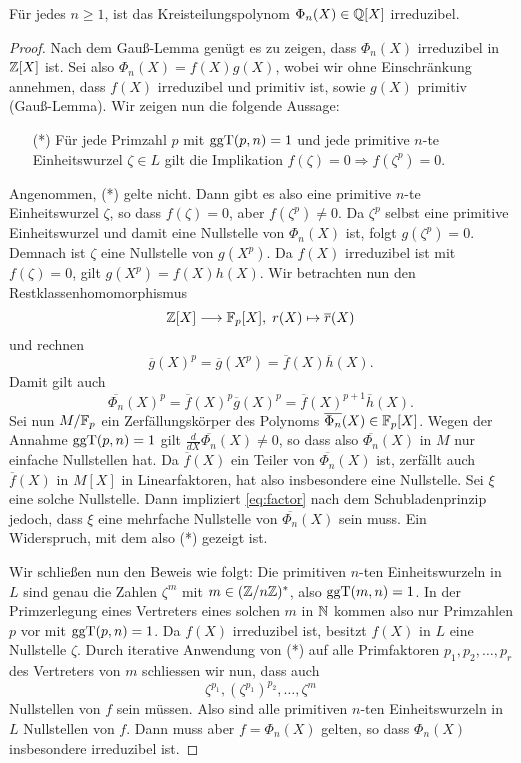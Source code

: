 \documentclass{book}
\begin{document}
\begin{thm}
Für jedes $n \ge 1$, ist das Kreisteilungspolynom $\Phi_n(X) \in \mathbb{Q}[X]$ irreduzibel. 
\end{thm}
\begin{proof}
	Nach dem Gauß-Lemma genügt es zu zeigen, dass $\Phi_n(X)$ irreduzibel in $\mathbb{Z}[X]$ ist. Sei
	also $\Phi_n(X) = f(X) g(X)$, wobei wir ohne Einschränkung annehmen, dass $f(X)$ irreduzibel
	und primitiv ist, sowie $g(X)$ primitiv (Gauß-Lemma). Wir zeigen nun die folgende Aussage:
	\begin{itemize}
		\item[(*)] Für jede Primzahl $p$ mit $\operatorname{ggT}(p,n) =1$ und jede primitive $n$-te
			Einheitswurzel $\zeta \in L$ gilt die Implikation $f(\zeta) = 0 \Rightarrow
			f(\zeta^p) = 0$. 
	\end{itemize}
	Angenommen, (*) gelte nicht. Dann gibt es also eine primitive $n$-te Einheitswurzel $\zeta$,
	so dass $f(\zeta) = 0$, aber $f(\zeta^p) \ne 0$. Da $\zeta^p$ selbst eine primitive
	Einheitswurzel und damit eine Nullstelle von $\Phi_n(X)$ ist, folgt $g(\zeta^p) = 0$.
	Demnach ist $\zeta$ eine Nullstelle von $g(X^p)$. Da $f(X)$ irreduzibel ist mit $f(\zeta) =
	0$, gilt $g(X^p) = f(X)h(X)$. Wir betrachten nun den Restklassenhomomorphismus
	\[
		\mathbb{Z}[X] \longrightarrow \mathbb{F}_p[X],\; r(X) \mapsto \overline{r}(X)
	\]
	und rechnen
	\[
		\overline{g}(X)^p = \overline{g}(X^p) = \overline{f}(X)\overline{h}(X).
	\]
	Damit gilt auch 
	\begin{equation}\label{eq:factor}
			\overline{\Phi_n}(X)^p = \overline{f}(X)^p\overline{g}(X)^p =
			\overline{f}(X)^{p+1}\overline{h}(X).
	\end{equation}
	Sei nun $M/\mathbb{F}_p$ ein Zerfällungskörper des Polynoms $\overline{\Phi_n}(X) \in \mathbb{F}_p[X]$.
	Wegen der Annahme $\operatorname{ggT}(p,n) = 1$ gilt $\frac{d}{dX}\overline{\Phi_n}(X) \ne 0$, so dass also
	$\overline{\Phi_n}(X)$ in $M$ nur einfache Nullstellen hat. Da $\overline{f}(X)$ ein Teiler
	von $\overline{\Phi_n}(X)$ ist, zerfällt auch $\overline{f}(X)$ in $M[X]$ in Linearfaktoren,
	hat also insbesondere eine Nullstelle. Sei $\xi$ eine solche Nullstelle. Dann impliziert
	\eqref{eq:factor} nach dem Schubladenprinzip jedoch, dass $\xi$ eine mehrfache Nullstelle von
	$\overline{\Phi_n}(X)$ sein muss. Ein Widerspruch, mit dem also (*) gezeigt ist. 

	Wir schließen nun den Beweis wie folgt: Die primitiven $n$-ten Einheitswurzeln in $L$ sind
	genau die Zahlen $\zeta^m$ mit $m \in (\mathbb{Z}/n\mathbb{Z} )^*$, also $\operatorname{ggT}(m,n) = 1$. In der
	Primzerlegung eines Vertreters eines solchen $m$ in $\mathbb{N}$ kommen also nur Primzahlen $p$ vor
	mit $\operatorname{ggT}(p,n) = 1$. Da $f(X)$ irreduzibel ist, besitzt $f(X)$ in $L$ eine Nullstelle
	$\zeta$. Durch iterative Anwendung von (*) auf alle Primfaktoren $p_1, p_2, \dots, p_r$ des Vertreters von $m$
	schliessen wir nun, dass auch 
	\[
		\zeta^{p_1}, (\zeta^{p_1})^{p_2}, \dots ,\zeta^m 
	\]
	Nullstellen von $f$ sein müssen. Also sind alle primitiven $n$-ten Einheitswurzeln in $L$
	Null\-stellen von
	$f$. Dann muss aber $f = \Phi_n(X)$ gelten, so dass $\Phi_n(X)$ insbesondere irreduzibel
	ist.  
\end{proof}
\end{document}

